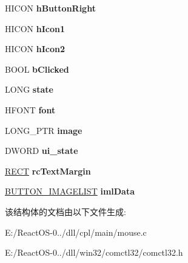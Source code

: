 \begin{DoxyCompactItemize}
H\+I\+C\+ON {\bfseries h\+Button\+Right}
\item 
\mbox{\label{struct___b_u_t_t_o_n___d_a_t_a_af628b2a7d6adc8e98824679978964acb}} 
H\+I\+C\+ON {\bfseries h\+Icon1}
\item 
\mbox{\label{struct___b_u_t_t_o_n___d_a_t_a_a3b13a5fb9e9e68dfb0387341b5a7eb9e}} 
H\+I\+C\+ON {\bfseries h\+Icon2}
\item 
\mbox{\label{struct___b_u_t_t_o_n___d_a_t_a_a59a52cc7cc717fd9d86d6a841ff6df46}} 
B\+O\+OL {\bfseries b\+Clicked}
\item 
\mbox{\label{struct___b_u_t_t_o_n___d_a_t_a_a4fe1841a1abe2bbfc44d5543e46c7cca}} 
L\+O\+NG {\bfseries state}
\item 
\mbox{\label{struct___b_u_t_t_o_n___d_a_t_a_aac00820c9c84f3fe24c54c93edd33132}} 
H\+F\+O\+NT {\bfseries font}
\item 
\mbox{\label{struct___b_u_t_t_o_n___d_a_t_a_aaccbc513b1d3dd3b45d1b10d1577c042}} 
L\+O\+N\+G\+\_\+\+P\+TR {\bfseries image}
\item 
\mbox{\label{struct___b_u_t_t_o_n___d_a_t_a_a63d549c9287a9caff6dcccf355455ad6}} 
D\+W\+O\+RD {\bfseries ui\+\_\+state}
\item 
\mbox{\label{struct___b_u_t_t_o_n___d_a_t_a_a1346981c7245df7198cc952da8f3623b}} 
\hyperlink{structtag_r_e_c_t}{R\+E\+CT} {\bfseries rc\+Text\+Margin}
\item 
\mbox{\label{struct___b_u_t_t_o_n___d_a_t_a_aa0488b6ef6519e605b86ea2ffb1bfee7}} 
\hyperlink{struct_b_u_t_t_o_n___i_m_a_g_e_l_i_s_t}{B\+U\+T\+T\+O\+N\+\_\+\+I\+M\+A\+G\+E\+L\+I\+ST} {\bfseries iml\+Data}
\end{DoxyCompactItemize}


该结构体的文档由以下文件生成\+:\begin{DoxyCompactItemize}
\item 
E\+:/\+React\+O\+S-\/0../dll/cpl/main/mouse.\+c\item 
E\+:/\+React\+O\+S-\/0../dll/win32/comctl32/comctl32.\+h\end{DoxyCompactItemize}
